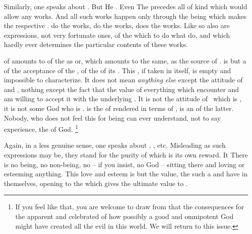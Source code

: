 \subpa Similarly, one speaks about .  But He
. Even  The  precedes all
 of  kind which would allow any works. 
And all such works happen only through the being which makes the
respective .   do the works,  do the 
works,  does the works. Like  so also  are expressions, not very fortunate ones, of the
  which   to do
what  do, and which hardly ever determines the particular contents of
these works.

\pa\label{adthankfulness}  of  amounts to
 of the  as  or, which amounts to
the same, as the source of .   is but a
 of the acceptance of the , of the
 of its .  This , if taken
in itself, is empty and impossible to characterize.  It does not mean
{\em anything else} except the attitude of  and
, nothing except the fact that  
the value of everything which  encounter and am willing to
accept it with the underlying .
It is not the
attitude of \yes\ which is , it is not some God who is
.   is the  of 
rendered in terms of , is an  of the latter. 
Nobody, who does not feel this  for being can ever
understand, not to say experience, the  of God. 
\footnote{If you
feel like that, you are welcome to draw from that the consequences for
the apparent and celebrated  of how possibly a good and
omnipotent God might have created all the evil in this world. We will 
return to this issue.}

\subpa Again, in a less genuine sense, one speaks about , , etc.  Misleading as such expressions
may be, they stand for the purity of  which is its
own reward.  It  There is no
being, no non-being, no  -- if you insist, no God --
sitting there and loving or esteeming anything.  This love and esteem
is but the value, the  such a  and
 have in themselves, opening  to the 
 which gives the ultimate value to .

